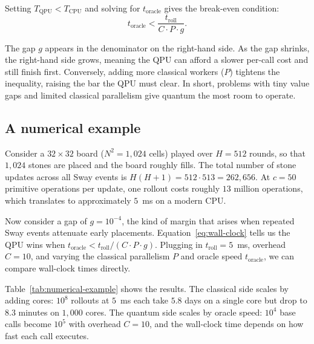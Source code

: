 Setting $T_{\text{QPU}} < T_{\text{CPU}}$ and solving for $t_{\text{oracle}}$ gives the break-even condition:
\begin{equation}
\label{eq:wall-clock}
t_{\text{oracle}} < \frac{t_{\text{roll}}}{C \cdot P \cdot g}.
\end{equation}

The gap $g$ appears in the denominator on the right-hand side. As the gap shrinks, the right-hand side grows, meaning the QPU can afford a slower per-call cost and still finish first. Conversely, adding more classical workers ($P$) tightens the inequality, raising the bar the QPU must clear. In short, problems with tiny value gaps and limited classical parallelism give quantum the most room to operate.

\subsection{A numerical example}

Consider a $32 \times 32$ board ($N^2 = 1{,}024$ cells) played over $H = 512$ rounds, so that $1{,}024$ stones are placed and the board roughly fills.
The total number of stone updates across all Sway events is $H(H+1) = 512 \cdot 513 = 262{,}656$.
At $c = 50$ primitive operations per update, one rollout costs roughly $13$ million operations, which translates to approximately $5$~ms on a modern CPU.

Now consider a gap of $g = 10^{-4}$, the kind of margin that arises when repeated Sway events attenuate early placements.
Equation~\ref{eq:wall-clock} tells us the QPU wins when $t_{\text{oracle}} < t_{\text{roll}} / (C \cdot P \cdot g)$.
Plugging in $t_{\text{roll}} = 5$~ms, overhead $C = 10$, and varying the classical parallelism $P$ and oracle speed $t_{\text{oracle}}$, we can compare wall-clock times directly.

Table~\ref{tab:numerical-example} shows the results.
The classical side scales by adding cores: $10^8$ rollouts at $5$~ms each take $5.8$ days on a single core but drop to $8.3$ minutes on $1{,}000$ cores.
The quantum side scales by oracle speed: $10^4$ base calls become $10^5$ with overhead $C = 10$, and the wall-clock time depends on how fast each call executes.

